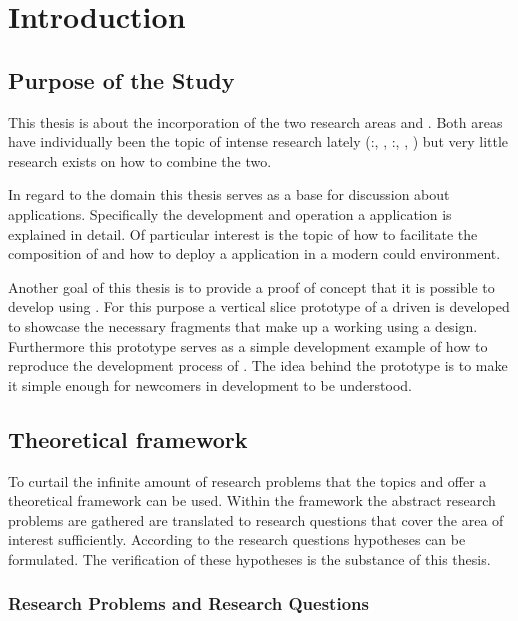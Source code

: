 \chapter{Introduction}

\section{Purpose of the Study}

This thesis is about the incorporation of the two research areas \mss{} and
\ogs{}. Both areas have individually been the topic of intense research lately
(\mss{}:\cite{zimmermann2016microservices}, \cite{di2017research},
\ogs{}:\cite{bosch2017towards}, \cite{smed2017algorithms},
\cite{liu2017apparatus}) but very little research exists on how to combine the
two.

In regard to the \mss{} domain this thesis serves as a base for discussion about
\ms{} applications. Specifically the development and operation a \ms{}
application is explained in detail. Of particular interest is the topic of how
to facilitate the composition of \mss{} and how to deploy a \ms{} application in
a modern could environment.

Another goal of this thesis is to provide a proof of concept that it is possible
to develop \ogs{} using \mss{}. For this purpose a vertical slice prototype of a
\ms{} driven \og{} is developed to showcase the necessary fragments that make up
a working \og{} using a \ms{} design. Furthermore this prototype serves as a
simple development example of how to reproduce the development process of
\ogs{}. The idea behind the prototype is to make it simple enough for newcomers
in \og{} development to be understood.


\section{Theoretical framework}

To curtail the infinite amount of research problems that the topics \ogs{} and
\mss{} offer a theoretical framework can be used. Within the framework the
abstract research problems are gathered are translated to research questions
that cover the area of interest sufficiently. According to the research
questions hypotheses can be formulated. The verification of these hypotheses is
the substance of this thesis.

\subsection{Research Problems and Research Questions}
\label{sub:problems}

